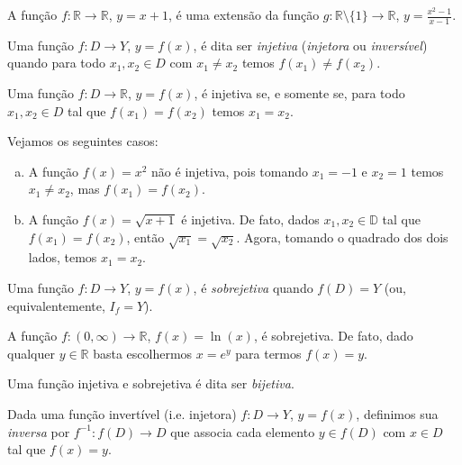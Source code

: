 \begin{ex}
  A função $f:\mathbb{R}\to\mathbb{R}$, $y=x+1$, é uma extensão da função $g:\mathbb{R}\setminus\{1\}\to\mathbb{R}$, $\displaystyle y=\frac{x^2-1}{x-1}$.
\end{ex}

\begin{defn}
  Uma função $f:D\to Y$, $y=f(x)$, é dita ser \emph{injetiva} (\emph{injetora} ou \emph{inversível}) quando para todo $x_1, x_2\in D$ com $x_1\neq x_2$ temos $f(x_1)\neq f(x_2)$.
\end{defn}

\begin{obs}
  Uma função $f:D\to\mathbb{R}$, $y=f(x)$, é injetiva se, e somente se, para todo $x_1, x_2\in D$ tal que $f(x_1)=f(x_2)$ temos $x_1=x_2$.
\end{obs}

\begin{ex}
  Vejamos os seguintes casos:
  \begin{enumerate}[a)]
  \item A função $f(x) = x^2$ não é injetiva, pois tomando $x_1=-1$ e $x_2=1$ temos $x_1\neq x_2$, mas $f(x_1)=f(x_2)$.
  \item A função $f(x) = \sqrt{x+1}$ é injetiva. De fato, dados $x_1, x_2\in\mathbb{D}$ tal que $f(x_1)=f(x_2)$, então $\sqrt{x_1} = \sqrt{x_2}$. Agora, tomando o quadrado dos dois lados, temos $x_1 = x_2$.
  \end{enumerate}
\end{ex}

\begin{defn}
  Uma função $f:D\to Y$, $y=f(x)$, é \emph{sobrejetiva} quando $f(D) = Y$ (ou, equivalentemente, $I_f = Y$).
\end{defn}

\begin{ex}
  A função $f:(0, \infty)\to\mathbb{R}$, $f(x) = \ln(x)$, é sobrejetiva. De fato, dado qualquer $y\in\mathbb{R}$ basta escolhermos $x = e^y$ para termos $f(x) = y$.
\end{ex}

\begin{obs}
  Uma função injetiva e sobrejetiva é dita ser \emph{bijetiva}.
\end{obs}

\begin{defn}
  Dada uma função invertível (i.e. injetora) $f:D\to Y$, $y=f(x)$, definimos sua \emph{inversa} por $f^{-1}:f(D)\to D$ que associa cada elemento $y\in f(D)$ com $x\in D$ tal que $f(x) = y$. 
\end{defn}

